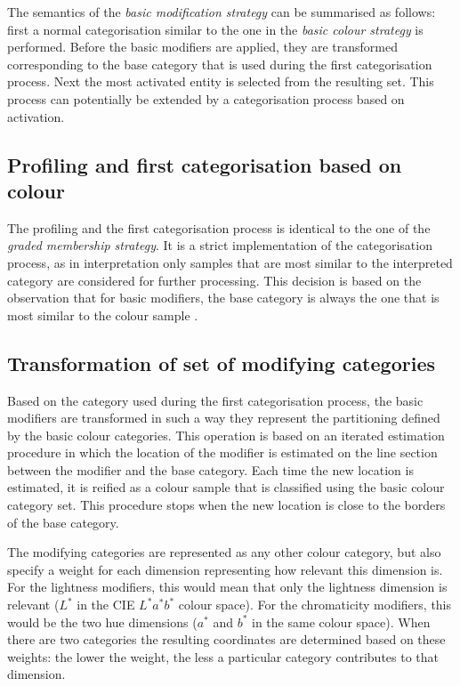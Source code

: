 The semantics of the \emph{basic modification strategy} can be
summarised as follows: first a normal categorisation similar to the
one in the \emph{basic colour strategy} is performed. Before the
basic modifiers are applied, they are transformed corresponding
to the base category that is used during the first categorisation
process. Next the most activated entity is selected from the resulting
set. This process can potentially be extended by a categorisation
process based on activation.

\subsection{Profiling and first categorisation based on colour}

The profiling and the first categorisation process is identical to the
one of the \emph{graded membership strategy}. It is a strict
implementation of the categorisation process, as in interpretation
only samples that are most similar to the interpreted category are
considered for further processing. This decision is based on the
observation that for basic modifiers, the base category is always
the one that is most similar to the colour sample
\citep{safuanova07russian}.

\subsection{Transformation of set of modifying categories}

Based on the category used during the first categorisation process,
the basic modifiers are transformed in such a way they represent 
the partitioning defined by the basic colour categories. This
operation is based on an iterated estimation procedure in which the
location of the modifier is estimated on the line section between the
modifier and the base category. Each time the new location is
estimated, it is reified as a colour sample that is classified using
the basic colour category set. This procedure stops when the new
location is close to the borders of the base category.

The modifying categories are represented as any other colour category,
but also specify a weight for each dimension representing how
relevant this dimension is. For the lightness modifiers, this would
mean that only the lightness dimension is relevant ($L^*$ in the CIE $L^*a^*b^*$ colour
space). For the chromaticity modifiers, this would be the two hue
dimensions ($a^*$ and $b^*$ in the same colour space). When there are two
categories the resulting coordinates are determined based on these
weights: the lower the weight, the less a particular category
contributes to that dimension.

